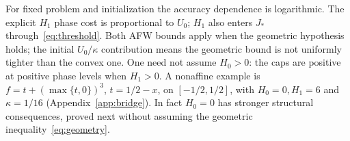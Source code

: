 For fixed problem and initialization the accuracy dependence is
logarithmic. The explicit $H_1$ phase cost is proportional to $U_0$;
$H_1$ also enters $J_*$ through~\eqref{eq:threshold}.
Both AFW bounds apply when the geometric hypothesis holds; the
initial $U_0/\kappa$ contribution means the geometric bound is not
uniformly tighter than the convex one.
One need not assume $H_0>0$: the caps are positive at positive phase
levels when $H_1>0$. A nonaffine example is $f=t+(\max\{t,0\})^3$,
$t=1/2-x$, on $[-1/2,1/2]$, with $H_0=0,H_1=6$ and
$\kappa=1/16$ (Appendix~\ref{app:bridge}). In fact $H_0=0$ has
stronger structural consequences, proved next without assuming
the geometric inequality~\eqref{eq:geometry}.
